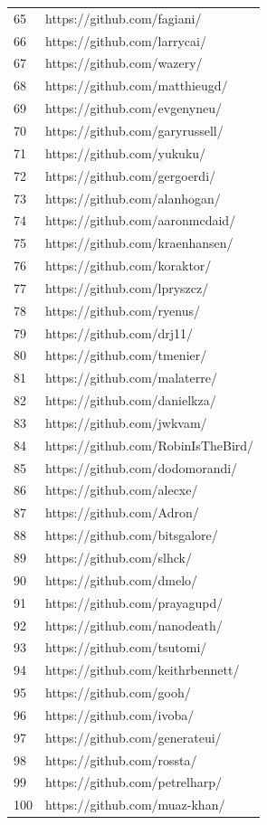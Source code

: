 \begin{center}
\begin{longtable}{|p{2cm}|p{7cm}|}
65 & https://github.com/fagiani/ \\
66 & https://github.com/larrycai/ \\
67 & https://github.com/wazery/ \\
68 & https://github.com/matthieugd/ \\
69 & https://github.com/evgenyneu/ \\
70 & https://github.com/garyrussell/ \\
71 & https://github.com/yukuku/ \\
72 & https://github.com/gergoerdi/ \\
73 & https://github.com/alanhogan/ \\
74 & https://github.com/aaronmcdaid/ \\
75 & https://github.com/kraenhansen/ \\
76 & https://github.com/koraktor/ \\
77 & https://github.com/lpryszcz/ \\
78 & https://github.com/ryenus/ \\
79 & https://github.com/drj11/ \\
80 & https://github.com/tmenier/ \\
81 & https://github.com/malaterre/ \\
82 & https://github.com/danielkza/ \\
83 & https://github.com/jwkvam/ \\
84 & https://github.com/RobinIsTheBird/ \\
85 & https://github.com/dodomorandi/ \\
86 & https://github.com/alecxe/ \\
87 & https://github.com/Adron/ \\
88 & https://github.com/bitsgalore/ \\
89 & https://github.com/slhck/ \\
90 & https://github.com/dmelo/ \\
91 & https://github.com/prayagupd/ \\
92 & https://github.com/nanodeath/ \\
93 & https://github.com/tsutomi/ \\
94 & https://github.com/keithrbennett/ \\
95 & https://github.com/gooh/ \\
96 & https://github.com/ivoba/ \\
97 & https://github.com/generateui/ \\
98 & https://github.com/rossta/ \\
99 & https://github.com/petrelharp/ \\
100 & https://github.com/muaz-khan/ \\

\hline
\end{longtable}
\end{center}


